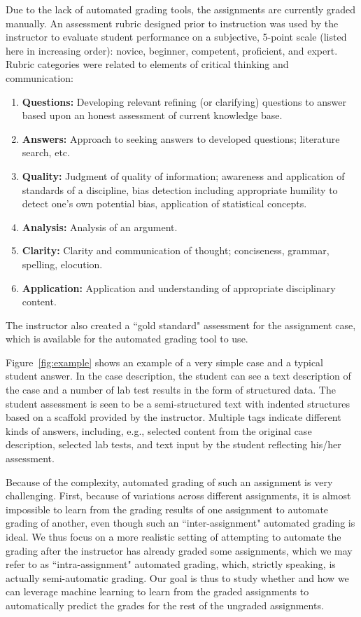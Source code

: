 Due to the lack of automated grading tools, the assignments are currently
graded manually. An assessment rubric designed prior to instruction was
used by the instructor to evaluate student performance on a subjective,
5-point scale (listed here in increasing order): novice, beginner,
competent, proficient, and expert. Rubric categories were related to
elements of critical thinking and communication:
\begin{enumerate}
\item {\bf Questions:} Developing relevant refining (or clarifying)
 questions to answer based upon an honest assessment of current knowledge
 base.
\item {\bf Answers:} Approach to seeking answers to developed
 questions; literature search, etc.
\item {\bf Quality:} Judgment of quality of information; awareness and
 application of standards of a discipline, bias detection including
 appropriate humility to detect one’s own potential bias, application of
 statistical concepts.
\item {\bf Analysis:} Analysis of an argument.
\item  {\bf Clarity:} Clarity and communication of thought; conciseness,
 grammar, spelling, elocution.
\item {\bf Application:} Application and understanding of appropriate
 disciplinary content.
\end{enumerate}

The instructor also created a ``gold standard" assessment for the
assignment case, which is available for the automated grading tool to use.

Figure~\ref{fig:example} shows an example of a very simple case and a typical
student answer. In the case description, the student can see a text
description of the case and a number of lab test results in the form of
structured data. The student assessment is seen to be a semi-structured
text with indented structures based on a scaffold provided by the
instructor. Multiple tags indicate different kinds of answers, including,
e.g., selected content from the original case description, selected lab
tests, and text input by the student reflecting his/her assessment.

Because of the complexity, automated grading of such an assignment is very
challenging. First, because of variations across different assignments, it
is almost impossible to learn from the grading results of one assignment to
automate grading of another, even though such an ``inter-assignment"
automated grading is ideal.  We thus focus on a more realistic setting of
attempting to automate the grading after the instructor has already graded
some assignments, which we may refer to as ``intra-assignment" automated
grading, which, strictly speaking, is actually semi-automatic grading.  Our
goal is thus to study whether and how we can leverage machine learning to
learn from the graded assignments to automatically predict the grades for
the rest of the ungraded assignments.

